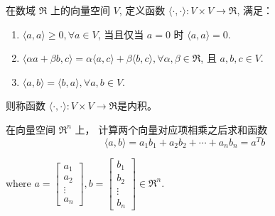 \begin{definition}[内积]
    在数域 $  \mathfrak{R}  $ 上的向量空间 $  V  $, 定义函数 $  \langle\cdot,\cdot\rangle:V \times V \rightarrow \mathfrak{R}  $, 满足：

    \begin{enumerate}
        \item $ \langle{a}, {a}\rangle \geq 0, \forall {a} \in V $, 当且仅当 $a=0$ 时 $ \langle a, a\rangle=0 $.
        \item $  \langle\alpha {a}+\beta {b}, c\rangle=\alpha\langle{a}, c\rangle+\beta\langle{b}, c\rangle, \forall \alpha, \beta \in \mathfrak{R}  $, 且 $  {a}, {b}, c \in V  $.
        \item $  \langle{a}, {b}\rangle=\langle{b}, {a}\rangle, \forall {a}, {b} \in V  $.
    \end{enumerate}

    则称函数 $  \langle\cdot,\cdot\rangle:V \times V \rightarrow \mathfrak{R}  $是内积。 
\end{definition}

\begin{example}
    在向量空间 $  \mathfrak{R}^{n}  $ 上，  计算两个向量对应项相乘之后求和函数
    \begin{equation} \langle a, b\rangle=a_{1} b_{1}+a_{2} b_{2}+\cdots+a_{n} b_{n}=a^{T}{b} \end{equation}

where $  a=\left[\begin{array}{c}a_{1} \\ a_{2} \\ \vdots \\ a_{n}\end{array}\right], b=\left[\begin{array}{c}b_{1} \\ b_{2} \\ \vdots \\ b_{n}\end{array}\right] \in \mathfrak{R}^{n}  $.
\end{example}

